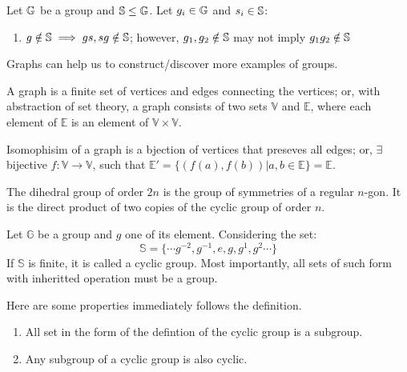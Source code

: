 \documentclass[../note.tex]{subfiles}
\begin{document}
\begin{theorem} 
	Let $\mathbb{G}$ be a group and $\mathbb{S}\leq \mathbb{G}$. Let $g_i\in \mathbb{G}$ and $s_i \in \mathbb{S}$:
	\begin{enumerate}
		\item $g\notin \mathbb{S} \implies gs, sg \notin \mathbb{S}$; however, $g_1, g_2 \notin \mathbb{S}$ may not imply $g_1g_2 \notin \mathbb{S}$
	\end{enumerate}
\end{theorem}

Graphs can help us to construct/discover more examples of groups.

\begin{definition}[Graph]
	A graph is a finite set of vertices and edges connecting the vertices;
	or, with abstraction of set theory, a graph consists of two sets $\mathbb{V}$ and $\mathbb{E}$, where each element of $\mathbb{E}$ is an element of $\mathbb{V}\times \mathbb{V}.$
\end{definition}

\begin{definition}[Isomophisim]
	Isomophisim of a graph is a bjection of vertices that preseves all edges;
	or, $\exists$ bijective $ f:\mathbb{V}\to \mathbb{V}$, such that $\mathbb{E}'= \{(f(a),f(b))|a,b \in \mathbb{E}\}=\mathbb{E}$.
\end{definition}

\begin{definition}
	The dihedral group of order $2n$ is the group of symmetries of a regular $n$-gon. It is the direct product of two copies of the cyclic group of order $n$.
\end{definition}

\begin{definition}
Let $\mathbb{G}$ be a group and $g$ one of its element. Considering the set:
\[
	\mathbb{S} = \{\cdots g^{-2}, g^{-1}, e, g, g^1, g^2 \cdots\}  
\]
If $\mathbb{S}$ is finite, it is called a cyclic group. Most importantly, all sets of such form with inheritted operation must be a group.
\end{definition}

\begin{theorem}
Here are some properties immediately follows the definition.
\begin{enumerate}
	\item All set in the form of the defintion of the cyclic group is a subgroup.
	\item \label{Cyclic_Inheritance}Any subgroup of a cyclic group is also cyclic.
\end{enumerate}	
\end{theorem}
\end{document}

